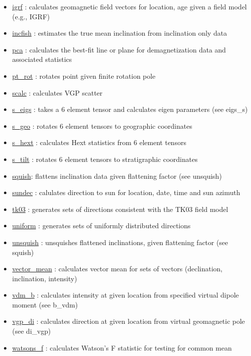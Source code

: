 \documentclass[11pt]{book}
\begin{document}
{{\begin{itemize}
\item \href{http://pmagpy.github.io/PmagPy.html#igrf}{igrf} : calculates geomagnetic field vectors for location, age given a field model (e.g., IGRF)
\item \href{http://pmagpy.github.io/PmagPy.html#incfish}{incfish} : estimates the true mean inclination from inclination only data
\item \href{http://pmagpy.github.io/PmagPy.html#pca}{pca} : calculates the best-fit line or plane for demagnetization data and associated statistics
\item \href{http://pmagpy.github.io/PmagPy.html#pt_rot}{pt\_rot} : rotates point given finite rotation pole
\item \href{http://pmagpy.github.io/PmagPy.html#scalc}{scalc} : calculates  VGP scatter
\item \href{http://pmagpy.github.io/PmagPy.html#s_eigs}{s\_eigs} : takes a 6 element tensor and calculates eigen parameters (see eigs\_s)
\item \href{http://pmagpy.github.io/PmagPy.html#s_geo}{s\_geo} : rotates 6 element tensors to geographic coordinates
\item \href{http://pmagpy.github.io/PmagPy.html#s_hext}{s\_hext} : calculates Hext statistics from 6 element tensors
\item \href{http://pmagpy.github.io/PmagPy.html#s_tilt}{s\_tilt} : rotates 6 element tensors to stratigraphic coordinates
\item \href{http://pmagpy.github.io/PmagPy.html#squish}{squish}: flattens inclination data given flattening factor (see unsquish)
\item \href{http://pmagpy.github.io/PmagPy.html#sundec}{sundec} : calulates direction to sun for location, date, time and sun azimuth
\item \href{http://pmagpy.github.io/PmagPy.html#tk03}{tk03} : generates sets of directions consistent with the TK03 field model
\item \href{http://pmagpy.github.io/PmagPy.html#uniform}{uniform} : generates sets of uniformly distributed directions
\item \href{http://pmagpy.github.io/PmagPy.html#unsquish}{unsquish} : unsquishes flattened inclinations, given flattening factor (see squish)
\item \href{http://pmagpy.github.io/PmagPy.html#vector_mean}{vector\_mean} : calculates vector mean for sets of vectors (declination, inclination, intensity)
\item \href{http://pmagpy.github.io/PmagPy.html#vdm_b}{vdm\_b} : calculates intensity at given location from specified virtual dipole moment (see b\_vdm)
\item \href{http://pmagpy.github.io/PmagPy.html#vgp_di}{vgp\_di} : calculates direction at given location from virtual geomagnetic pole (see di_vgp)
\item \href{http://pmagpy.github.io/PmagPy.html#watsons_f}{watsons\_f} : calculates Watson's F statistic for testing for common mean


\end{itemize}}}
\end{document}
